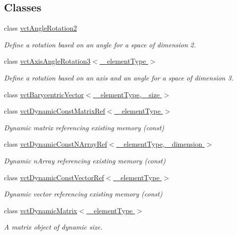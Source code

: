 \subsection*{Classes}
\begin{DoxyCompactItemize}
\item 
class \hyperlink{classvct_angle_rotation2}{vct\-Angle\-Rotation2}
\begin{DoxyCompactList}\small\item\em Define a rotation based on an angle for a space of dimension 2. \end{DoxyCompactList}\item 
class \hyperlink{classvct_axis_angle_rotation3}{vct\-Axis\-Angle\-Rotation3$<$ \-\_\-element\-Type $>$}
\begin{DoxyCompactList}\small\item\em Define a rotation based on an axis and an angle for a space of dimension 3. \end{DoxyCompactList}\item 
class \hyperlink{classvct_barycentric_vector}{vct\-Barycentric\-Vector$<$ \-\_\-element\-Type, \-\_\-size $>$}
\item 
class \hyperlink{classvct_dynamic_const_matrix_ref}{vct\-Dynamic\-Const\-Matrix\-Ref$<$ \-\_\-element\-Type $>$}
\begin{DoxyCompactList}\small\item\em Dynamic matrix referencing existing memory (const) \end{DoxyCompactList}\item 
class \hyperlink{classvct_dynamic_const_n_array_ref}{vct\-Dynamic\-Const\-N\-Array\-Ref$<$ \-\_\-element\-Type, \-\_\-dimension $>$}
\begin{DoxyCompactList}\small\item\em Dynamic n\-Array referencing existing memory (const) \end{DoxyCompactList}\item 
class \hyperlink{classvct_dynamic_const_vector_ref}{vct\-Dynamic\-Const\-Vector\-Ref$<$ \-\_\-element\-Type $>$}
\begin{DoxyCompactList}\small\item\em Dynamic vector referencing existing memory (const) \end{DoxyCompactList}\item 
class \hyperlink{classvct_dynamic_matrix}{vct\-Dynamic\-Matrix$<$ \-\_\-element\-Type $>$}
\begin{DoxyCompactList}\small\item\em A matrix object of dynamic size. \end{DoxyCompactList}\item 

\end{DoxyCompactItemize}
